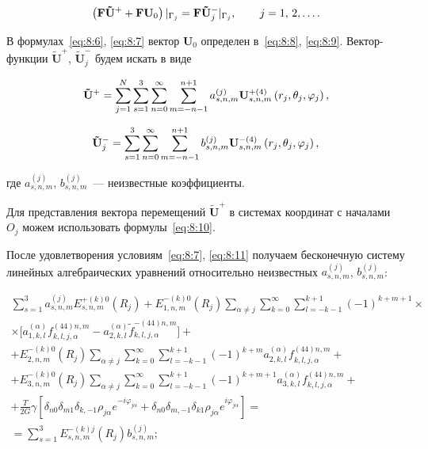 \begin{russian}
\begin{equation}
\left( {{\bf{F\tilde U^+}} + {\bf{F}}{{\bf{U}}_0}} \right){|_{{\Gamma _j}}} = {\bf{F}}{{\bf{\tilde U^-}}_j}{|_{{\Gamma _j}}},\qquad {\kern 1pt} j = 1,{\mkern 1mu} {\kern 1pt} 2,\dots.
\label{eq:8:11}
\end{equation}

В формулах~\eqref{eq:8:6}, \eqref{eq:8:7} вектор $\mathbf{U}_0$ определен в~\eqref{eq:8:8}, \eqref{eq:8:9}. Вектор-функции $\mathbf{\tilde U}^+$, $\mathbf{\tilde U}_j^-$ будем искать в виде

\begin{equation}
{{\bf{\tilde U}}^ + } = \mathop \sum \limits_{j = 1}^N \sum\limits_{s = 1}^3 {\sum\limits_{n = 0}^\infty  {\sum\limits_{m =  - n - 1}^{n + 1} {a_{s,n,m}^{(j)}} } } {\bf{U}}_{s,n,m}^{ + (4)}\left( {{r_j},{\theta _j},{\varphi _j}} \right),
\end{equation}

\begin{equation}
{\bf{\tilde U}}_j^ -  = \sum\limits_{s = 1}^3 {\sum\limits_{n = 0}^\infty  {\sum\limits_{m =  - n - 1}^{n + 1} {b_{s,n,m}^{(j)}} } } {\bf{U}}_{s,n,m}^{ - (4)}\left( {{r_j},{\theta _j},{\varphi _j}} \right),
\end{equation}

\noindent где $a_{s,n,m}^{(j)}$, $b_{s,n,m}^{(j)}$~--- неизвестные коэффициенты.

Для представления вектора перемещений $\mathbf{\tilde U}^+$ в системах координат с началами $O_j$ можем использовать формулы~\eqref{eq:8:10}.

После удовлетворения условиям~\eqref{eq:8:7}, \eqref{eq:8:11} получаем бесконечную систему линейных алгебраических уравнений относительно неизвестных $a_{s,n,m}^{(j)}$, $b_{s,n,m}^{(j)}$:

\begin{multline}
\sum\limits_{s = 1}^3 {a_{s,n,m}^{(j)}} E_{s,n,m}^{ + (k)0}({R_j}) + E_{1,n,m}^{ - (k)0}({R_j})\sum\limits_{\alpha  \ne j} \sum\limits_{k = 0}^\infty  {\sum\limits_{l =  - k - 1}^{k + 1} {{{( - 1)}^{k + m + 1}}} }\times \\
\times\bigg[ {a_{1,k,l}^{(\alpha )}f_{k,l,j,\alpha }^{(44)n,m} - }{a_{2,k,l}^{(\alpha )}\tilde f_{k,l,j,\alpha }^{ - (44)n,m}} \bigg] + \\
+ E_{2,n,m}^{ - (k)0}({R_j})\sum\limits_{\alpha  \ne j} {\sum\limits_{k = 0}^\infty  {\sum\limits_{l =  - k - 1}^{k + 1} {{{( - 1)}^{k + m}}} } a_{2,k,l}^{(\alpha )}f_{k,l,j,\alpha }^{(44)n,m} + } \\
+ E_{3,n,m}^{ - (k)0}({R_j})\sum\limits_{\alpha  \ne j} {\sum\limits_{k = 0}^\infty  {\sum\limits_{l =  - k - 1}^{k + 1} {{{( - 1)}^{k + m + 1}}} } a_{3,k,l}^{(\alpha )}f_{k,l,j,\alpha }^{(44)n,m} + } \\
+ \frac{T}{{2G}}\gamma \left[ {{\delta _{n0}}{\delta _{m1}}{\delta _{k, - 1}}{\rho _{j\alpha }}{e^{ - i{\varphi _{j\alpha }}}} + {\delta _{n0}}{\delta _{m, - 1}}{\delta _{k1}}{\rho _{j\alpha }}{e^{i{\varphi _{j\alpha }}}}} \right] = \\
= \sum\limits_{s = 1}^3 {E_{s,n,m}^{ - (k)j}} ({R_j})b_{s,n,m}^{(j)};
\end{multline}


\end{russian}
